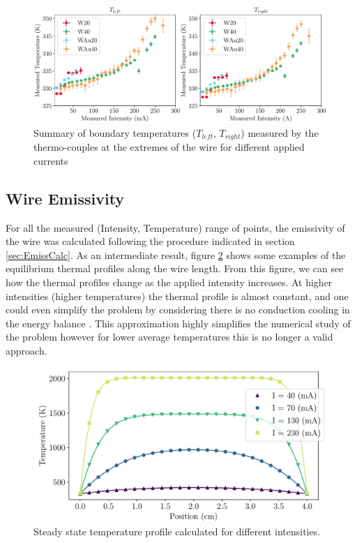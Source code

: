 \begin{figure}[h]
    \centering
    \includegraphics[width=1.0\columnwidth]{Figure_TrightTleft/TleftTright.pdf}
    \caption{Summary of boundary temperatures ($T_{left}$, $T_{right}$) measured by the thermo-couples at the extremes of the wire for different applied currents}
    \label{fig:summaryTleftTright}
\end{figure}

\subsection{Wire Emissivity}

For all the measured (Intensity, Temperature) range of points, the emissivity of the wire was calculated following the procedure indicated in section \ref{sec:EmissCalc}. As an intermediate result, figure \ref{fig:ThermalProfile} shows some examples of the equilibrium thermal profiles along the wire length. From this figure, we can see how the thermal profiles change as the applied intensity increases. At higher intensities (higher temperatures) the thermal profile is almost constant, and one could even simplify the problem by considering there is no conduction cooling in the energy balance \parencite[]{ref:tungstenemissi}. This approximation highly simplifies the numerical study of the problem however for lower average temperatures this is no longer a valid approach. 

\begin{figure}[h!]
    \centering
    \includegraphics[width=0.75\columnwidth]{TempProf/TempProfPlot.pdf}
    \caption{Steady state temperature profile calculated for different intensities.}
    \label{fig:ThermalProfile}
\end{figure}

